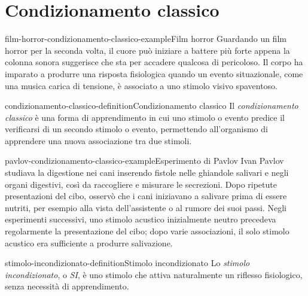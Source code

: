 \documentclass[preview]{standalone}
\begin{document}
\genpage

\section{Condizionamento classico}

\begin{snippetexample}{film-horror-condizionamento-classico-example}{Film horror}
    Guardando un film horror per la seconda volta, il cuore può iniziare a
    battere più forte appena la colonna sonora suggerisce che sta per accadere
    qualcosa di pericoloso. Il corpo ha imparato a produrre una risposta
    fisiologica quando un evento situazionale, come una musica carica di
    tensione, è associato a uno stimolo visivo spaventoso.
\end{snippetexample}

\begin{snippetdefinition}{condizionamento-classico-definition}{Condizionamento classico}
    Il \emph{condizionamento classico} è una forma di apprendimento in cui uno
    stimolo o evento predice il verificarsi di un secondo stimolo o evento,
    permettendo all'organismo di apprendere una nuova associazione tra due
    stimoli.
\end{snippetdefinition}

\begin{snippetexample}{pavlov-condizionamento-classico-example}{Esperimento di Pavlov}
    Ivan Pavlov studiava la digestione nei cani inserendo fistole nelle
    ghiandole salivari e negli organi digestivi, così da raccogliere e misurare
    le secrezioni. Dopo ripetute presentazioni del cibo, osservò che i cani
    iniziavano a salivare prima di essere nutriti, per esempio alla vista
    dell'assistente o al rumore dei suoi passi. Negli esperimenti successivi,
    uno stimolo acustico inizialmente neutro precedeva regolarmente la
    presentazione del cibo; dopo varie associazioni, il solo stimolo acustico
    era sufficiente a produrre salivazione.
\end{snippetexample}


\begin{snippetdefinition}{stimolo-incondizionato-definition}{Stimolo incondizionato}
    Lo \emph{stimolo incondizionato}, o \emph{SI}, è uno stimolo che attiva
    naturalmente un riflesso fisiologico, senza necessità di apprendimento.
\end{snippetdefinition}
\end{document}
